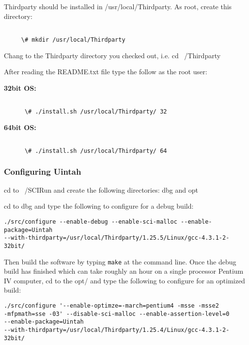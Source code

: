 \documentclass[12pt]{report}
\begin{document}
Thirdparty should be installed in /usr/local/Thirdparty.  As root,
create this directory:

\begin{verbatim}

     \# mkdir /usr/local/Thirdparty

\end{verbatim}

Chang to the Thirdparty directory you checked out, i.e. cd ~/Thirdparty

After reading the README.txt file type the follow as the root user:

\textbf{32bit OS:}

\begin{verbatim}

      \# ./install.sh /usr/local/Thirdparty/ 32

\end{verbatim}

\textbf{64bit OS:}


\begin{verbatim}

      \# ./install.sh /usr/local/Thirdparty/ 64

\end{verbatim}


\subsubsection{Configuring Uintah}

cd to ~/SCIRun and create the following directories: dbg and opt

cd to dbg and type the following to configure for a debug build:

\begin{verbatim}
./src/configure --enable-debug --enable-sci-malloc --enable-package=Uintah 
--with-thirdparty=/usr/local/Thirdparty/1.25.5/Linux/gcc-4.3.1-2-32bit/
\end{verbatim}

Then build the software by typing \texttt{make} at the command
line. Once the debug build has finished which can take roughly an hour
on a single processor Pentium IV computer, cd to the opt/ and type the
following to configure for an optimized build:

\begin{verbatim}
./src/configure '--enable-optimze=-march=pentium4 -msse -msse2 
-mfpmath=sse -03' --disable-sci-malloc --enable-assertion-level=0 
--enable-package=Uintah 
--with-thirdparty=/usr/local/Thirdparty/1.25.4/Linux/gcc-4.3.1-2-32bit/
\end{verbatim}
\end{document}
